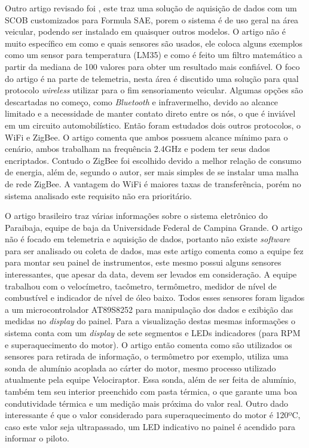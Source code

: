 Outro artigo revisado foi \cite{vehicleDataAcquisition2014}, este traz uma solução de aquisição de dados com um SCOB customizados para Formula SAE, porem o sistema é de uso geral na área veicular, podendo ser instalado em quaisquer outros modelos. O artigo não é muito específico em como e quais sensores são usados, ele coloca alguns exemplos como um sensor para temperatura (LM35) e como é feito um filtro matemático a partir da mediana de 100 valores para obter um resultado mais confiável. O foco do artigo é na parte de telemetria, nesta área é discutido uma solução para qual protocolo \textit{wireless} utilizar para o fim sensoriamento veicular. Algumas opções são descartadas no começo, como \textit{Bluetooth} e infravermelho, devido ao alcance limitado e a necessidade de manter contato direto entre os nós, o que é inviável em um circuito automobilístico. Então foram estudados dois outros protocolos, o WiFi e ZigBee. O artigo comenta que ambos possuem alcance mínimo para o cenário, ambos trabalham na frequência 2.4GHz e podem ter seus dados encriptados. Contudo o ZigBee foi escolhido devido a melhor relação de consumo de energia, além de, segundo o autor, ser mais simples de se instalar uma malha de rede ZigBee. A vantagem do WiFi é maiores taxas de transferência, porém no sistema analisado este requisito não era prioritário.         

O artigo brasileiro \cite{projetoMiniBaja2006} traz várias informações sobre o sistema eletrônico do Paraibaja, equipe de baja da Universidade Federal de Campina Grande. O artigo não é focado em telemetria e aquisição de dados, portanto não existe \textit{software} para ser analisado ou coleta de dados, mas este artigo comenta como a equipe fez para montar seu painel de instrumentos, este mesmo possui alguns sensores interessantes, que apesar da data, devem ser levados em consideração. A equipe trabalhou com o velocímetro, tacômetro, termômetro, medidor de nível de combustível e indicador de nível de óleo baixo. Todos esses sensores foram ligados a um microcontrolador AT89S8252 para manipulação dos dados e exibição das medidas no \textit{display} do painel. Para a visualização destas mesmas informações o sistema conta com um \textit{display} de sete segmentos e LEDs indicadores (para RPM e superaquecimento do motor). O artigo então comenta como são utilizados os sensores para retirada de informação, o termômetro por exemplo, utiliza uma sonda de alumínio acoplada ao cárter do motor, mesmo processo utilizado atualmente pela equipe Velociraptor. Essa sonda, além de ser feita de alumínio, também tem seu interior preenchido com pasta térmica, o que garante uma boa condutividade térmica e um medição mais próxima do valor real. Outro dado interessante é que o valor considerado para superaquecimento do motor é 120ºC, caso este valor seja ultrapassado, um LED indicativo no painel é acendido para informar o piloto.       

